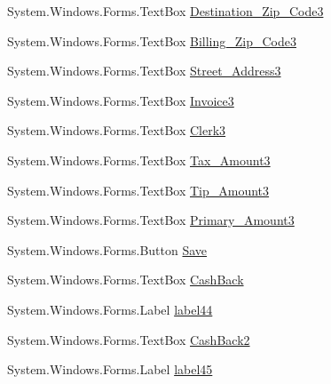 \begin{DoxyCompactItemize}
\item 
System.\+Windows.\+Forms.\+Text\+Box \mbox{\hyperlink{class_cert_complete_1_1_test___creation___form_a0a106801dd7a9f691f617adfea94e873}{Destination\+\_\+\+Zip\+\_\+\+Code3}}
\item 
System.\+Windows.\+Forms.\+Text\+Box \mbox{\hyperlink{class_cert_complete_1_1_test___creation___form_a53641e87a781cc5da595f61e9556c587}{Billing\+\_\+\+Zip\+\_\+\+Code3}}
\item 
System.\+Windows.\+Forms.\+Text\+Box \mbox{\hyperlink{class_cert_complete_1_1_test___creation___form_aba99e4ad224570bf43c5498cf5a7d3d3}{Street\+\_\+\+Address3}}
\item 
System.\+Windows.\+Forms.\+Text\+Box \mbox{\hyperlink{class_cert_complete_1_1_test___creation___form_ac00e2a14f2ad97cf592ef414ce927650}{Invoice3}}
\item 
System.\+Windows.\+Forms.\+Text\+Box \mbox{\hyperlink{class_cert_complete_1_1_test___creation___form_aa7514c48495734b891c855e09fb739ca}{Clerk3}}
\item 
System.\+Windows.\+Forms.\+Text\+Box \mbox{\hyperlink{class_cert_complete_1_1_test___creation___form_a7163b4d99fc000ef2df2b1785111d61d}{Tax\+\_\+\+Amount3}}
\item 
System.\+Windows.\+Forms.\+Text\+Box \mbox{\hyperlink{class_cert_complete_1_1_test___creation___form_a241947418ba0c0e467cadf9f81b5597b}{Tip\+\_\+\+Amount3}}
\item 
System.\+Windows.\+Forms.\+Text\+Box \mbox{\hyperlink{class_cert_complete_1_1_test___creation___form_ae3155965e861f08e306ed7f4547b37ea}{Primary\+\_\+\+Amount3}}
\item 
System.\+Windows.\+Forms.\+Button \mbox{\hyperlink{class_cert_complete_1_1_test___creation___form_a52757595ae452fdfa8a23ceb8ccf1018}{Save}}
\item 
System.\+Windows.\+Forms.\+Text\+Box \mbox{\hyperlink{class_cert_complete_1_1_test___creation___form_a5f4fe2de9226cd52073eb9bf37dd1dd2}{Cash\+Back}}
\item 
System.\+Windows.\+Forms.\+Label \mbox{\hyperlink{class_cert_complete_1_1_test___creation___form_af0e2bd86fe25f2cedb3a3b83d60cfa8c}{label44}}
\item 
System.\+Windows.\+Forms.\+Text\+Box \mbox{\hyperlink{class_cert_complete_1_1_test___creation___form_a7c762bc502efaaf49875e54a8c4ba15c}{Cash\+Back2}}
\item 
System.\+Windows.\+Forms.\+Label \mbox{\hyperlink{class_cert_complete_1_1_test___creation___form_a62dfd700eb7130f22ddfc6fda676c8e8}{label45}}

\end{DoxyCompactItemize}
